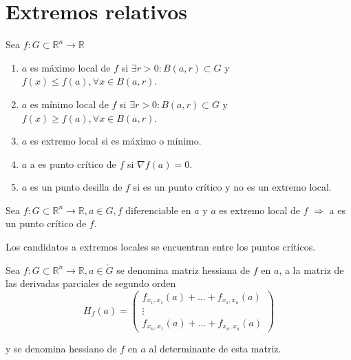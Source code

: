\section{Extremos relativos}

\begin{defn}
Sea $f:G\subset\mathbb{R}^n\rightarrow\mathbb{R}$
\begin{enumerate}[label=(\roman*)]
    \item $a$ es máximo local de $f$ si $\exists r>0: B(a,r) \subset G$ y $f(x) \leq f(a), \forall x\in B(a,r)$.
    \item $a$ es mínimo local de $f$ si $\exists r>0: B(a,r) \subset G$ y $f(x) \geq f(a), \forall x\in B(a,r)$.
    \item $a$ es extremo local si es máximo o mínimo.
    \item $a$ a es punto crítico de $f$ si $\nabla{f(a)}=0$.
    \item $a$ es un punto desilla de $f$ si es un punto crítico y no es un extremo local.
\end{enumerate}
\end{defn}

\begin{prop}
Sea $f:G\subset\mathbb{R}^n\rightarrow\mathbb{R}, a\in G, f$ diferenciable en $a$ y
$a$ es extremo local de $f$ $\Rightarrow$ a es un punto crítico de $f$.
\end{prop}

\begin{dem}

\end{dem}

\begin{obs}
Los candidatos a extremos locales se encuentran entre los puntos críticos.
\end{obs}

\begin{defn}
Sea $f:G\subset\mathbb{R}^n\rightarrow\mathbb{R}, a\in \mathring{G}$ se denomina matriz hessiana de $f$ en $a$, a la matriz de las derivadas parciales de segundo orden 
\[ H_f(a) =
    \begin{pmatrix}
        f_{x_1,x_1}(a) + ... + f_{x_1,x_n}(a) \\
        \vdots\\
        f_{x_n,x_1}(a) + ... + f_{x_n,x_n}(a)
    \end{pmatrix}
\]

y se denomina hessiano de $f$ en $a$ al determinante de esta matriz.\end{defn}

